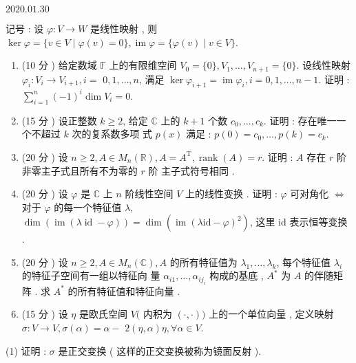 \documentclass[10pt]{article}
\begin{document}
   

$2020.01 .30$

 记号 :  设  $\varphi: V \rightarrow W$  是线性映射 ,  则  $\operatorname{ker} \varphi=\{v \in V \mid \varphi(v)=0\}, \operatorname{im} \varphi=\{\varphi(v) \mid v \in V\}$.

\begin{enumerate}
  \item (10  分 )  给定数域  $\mathbb{F}$  上的有限维空间  $V_{0}=\{0\}, V_{1}, \ldots, V_{n+1}=\{0\}$.  设线性映射  $\varphi_{i}: V_{i} \rightarrow V_{i+1}, i=$ $0,1, \ldots, n$,  满足  $\operatorname{ker} \varphi_{i+1}=\operatorname{im} \varphi_{i}, i=0,1, \ldots, n-1$.  证明 : $\sum_{i=1}^{n}(-1)^{i} \operatorname{dim} V_{i}=0$.

  \item (15  分 )  设正整数  $k \geqslant 2$,  给定  $\mathbb{C}$  上的  $k+1$  个数  $c_{0}, \ldots, c_{k}$.  证明 :  存在唯一一个不超过  $k$  次的复系数多项   式  $p(x)$  满足 : $p(0)=c_{0}, \ldots, p(k)=c_{k}$.

  \item (20  分 )  设  $n \geqslant 2, A \in M_{n}(\mathbb{R}), A=A^{\mathrm{T}}, \operatorname{rank}(A)=r$.  证明 : $A$  存在  $r$  阶非零主子式且所有不为零的  $r$  阶   主子式符号相同 .

  \item (20  分 )  设  $\varphi$  是  $\mathbb{C}$  上  $n$  阶线性空间  $V$  上的线性变换 .  证明 : $\varphi$  可对角化  $\Longleftrightarrow$  对于  $\varphi$  的每一个特征值  $\lambda$, $\operatorname{dim}(\operatorname{im}(\lambda \operatorname{id}-\varphi))=\operatorname{dim}\left(\operatorname{im}(\lambda \mathrm{id}-\varphi)^{2}\right)$,  这里  id  表示恒等变换 .

  \item (20  分 )  设  $n \geqslant 2, A \in M_{n}(\mathbb{C}), A$  的所有特征值为  $\lambda_{1}, \ldots, \lambda_{k}$,  每个特征值  $\lambda_{i}$  的特征子空间有一组以特征向   量  $\alpha_{i 1}, \ldots, \alpha_{i j_{i}}$  构成的基底 , $A^{*}$  为  $A$  的伴随矩阵 .  求  $A^{*}$  的所有特征值和特征向量 .

  \item (15  分 )  设  $\eta$  是欧氏空间  $V($  内积为  $(\cdot, \cdot))$  上的一个单位向量 ,  定义映射  $\sigma: V \rightarrow V, \sigma(\alpha)=\alpha-$ $2(\eta, \alpha) \eta, \forall \alpha \in V$.

\end{enumerate}
(1)  证明 : $\sigma$  是正交变换  ( 这样的正交变换被称为镜面反射 ).
\end{document}
